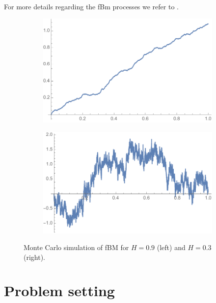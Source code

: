 \documentclass[11pt]{article}
\begin{document}
For more details regarding the fBm processes we refer to \cite{biagini2008stochastic,coutin07introduction,mandelbrot1968fractional}.

\begin{figure}[h!]
	\centering
	\begin{subfigure}{.45\textwidth}
		\centering
		\includegraphics[width=1\linewidth]{./figures/fbm_H_0_9}
		\caption{}
		\label{fig:sub3}
	\end{subfigure}%
	\begin{subfigure}{.45\textwidth}
		\centering
		\includegraphics[width=1\linewidth]{./figures/fbm_H_0_3}
		\caption{}
		\label{fig:sub4}
	\end{subfigure}
	\caption{Monte Carlo simulation of fBM for $H = 0.9$ (left) and $H = 0.3$ (right).}
	\label{fig:fBM}
\end{figure}



\section{Problem setting}
\end{document}
